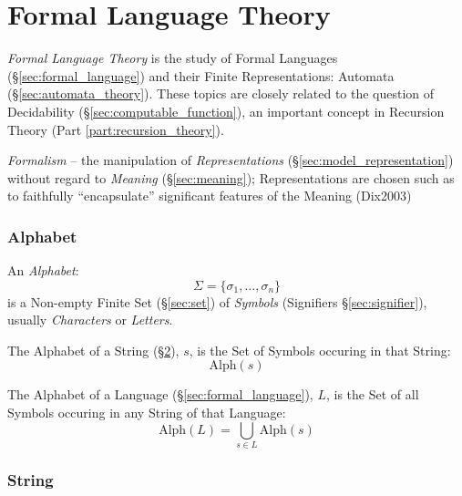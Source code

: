 \part{Formal Language Theory}\label{part:formal_language}
\cite{hammel03}

\emph{Formal Language Theory} is the study of Formal Languages
(\S\ref{sec:formal_language}) and their Finite Representations: Automata
(\S\ref{sec:automata_theory}). These topics are closely related to the question
of Decidability (\S\ref{sec:computable_function}), an important concept in
Recursion Theory (Part \ref{part:recursion_theory}).

\emph{Formalism} -- the manipulation of \emph{Representations}
(\S\ref{sec:model_representation}) without regard to \emph{Meaning}
(\S\ref{sec:meaning}); Representations are chosen such as to faithfully
``encapsulate'' significant features of the Meaning (Dix2003)



\section{Alphabet}\label{sec:alphabet}

An \emph{Alphabet}:
\[
  \Sigma = \{ \sigma_1, \ldots, \sigma_n \}
\]
is a Non-empty Finite Set (\S\ref{sec:set}) of \emph{Symbols} (Signifiers
\S\ref{sec:signifier}), usually \emph{Characters} or \emph{Letters}.

The Alphabet of a String (\S\ref{sec:string}), $s$, is the Set of Symbols
occuring in that String:
\[
  \mathrm{Alph}(s)
\]

The Alphabet of a Language (\S\ref{sec:formal_language}), $L$, is the Set of all
Symbols occuring in any String of that Language:
\[
  \mathrm{Alph}(L) = \bigcup_{s \in L} \mathrm{Alph}(s)
\]



\section{String}\label{sec:string}

